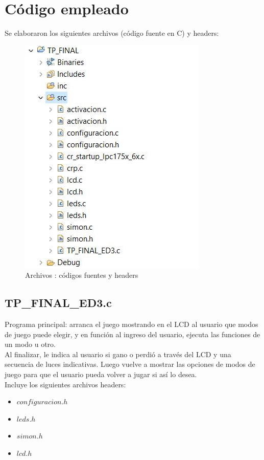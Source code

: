\documentclass[paper=letter, fontsize=12pt]{article}
\begin{document}
\section{\textbf{Código empleado}}

Se elaboraron los siguientes archivos (código fuente en C) y headers:\\
\begin{figure}[H]
  \includegraphics[scale=0.85]{Jerarquia.jpg}
  \caption{Archivos : códigos fuentes y headers}
 \end{figure}
 
 \hfill \break
 \hfill \break 

 
\subsection{\textbf{TP\_FINAL\_ED3.c}}
 Programa principal: arranca el juego mostrando en el LCD al usuario que modos de juego puede elegir, y en función al ingreso del usuario, ejecuta las funciones de un modo u otro. \\
 Al finalizar, le indica al usuario si gano o perdió a través del LCD y una secuencia de luces indicativas. Luego vuelve a mostrar las opciones de modos de juego para que el usuario pueda volver a jugar si así lo desea.\\
 Incluye los siguientes archivos headers:
 \begin{itemize}
 \item $configuracion.h$
 \item $leds.h$
 \item$simon.h$
 \item$lcd.h$
 \end{itemize}
  
\end{document}
